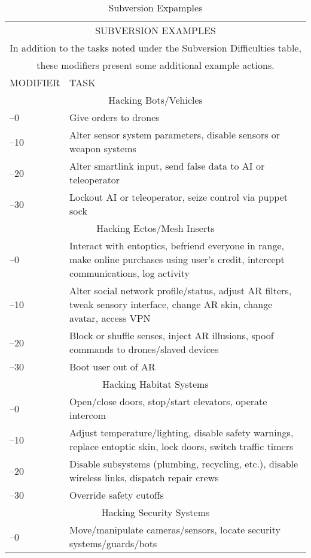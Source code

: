 \begin{table}
\caption{Subversion Expamples}
\begin{tabularx}{\textwidth}{|l|X|}
\hline
\multicolumn{2}{|c|}{SUBVERSION EXAMPLES} \\
\multicolumn{2}{|c|}{In addition to the tasks noted under the Subversion Difficulties table,} \\
\multicolumn{2}{|c|}{these modifiers present some additional example actions.} \\
\hline
\hline
MODIFIER & TASK \\
\hline
\multicolumn{2}{|c|}{Hacking Bots/Vehicles} \\
\hline
–0 & Give orders to drones \\
\hline
–10 & Alter sensor system parameters, disable sensors or weapon systems \\
\hline
–20 & Alter smartlink input, send false data to AI or teleoperator \\
\hline
–30 & Lockout AI or teleoperator, seize control via puppet sock \\
\hline
\multicolumn{2}{|c|}{Hacking Ectos/Mesh Inserts} \\
\hline
–0 & Interact with entoptics, befriend everyone in range, make online purchases using user's credit, intercept communications, log activity \\
\hline
–10 & Alter social network profile/status, adjust AR filters, tweak sensory interface, change AR skin, change avatar, access VPN \\
\hline
–20 & Block or shuffle senses, inject AR illusions, spoof commands to drones/slaved devices \\
\hline
–30 & Boot user out of AR \\
\hline
\multicolumn{2}{|c|}{Hacking Habitat Systems} \\
\hline
–0 &  Open/close doors, stop/start elevators, operate intercom \\
\hline
–10 & Adjust temperature/lighting, disable safety warnings, replace entoptic skin, lock doors, switch traffic timers \\
\hline
–20 & Disable subsystems (plumbing, recycling, etc.), disable wireless links, dispatch repair crews \\
\hline
–30 & Override safety cutoffs \\
\hline
\multicolumn{2}{|c|}{Hacking Security Systems} \\
\hline
–0 & Move/manipulate cameras/sensors, locate security systems/guards/bots \\

\end{tabularx}
\end{table}
